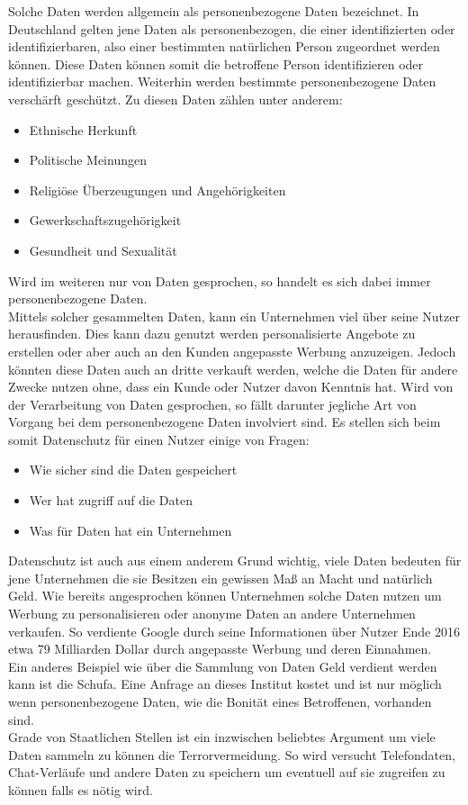 \documentclass[a4paper, 12pt]{article}
\begin{document}
\noindent 
Solche Daten werden allgemein als personenbezogene Daten bezeichnet. In Deutschland gelten jene Daten als personenbezogen, die einer identifizierten oder identifizierbaren, also einer bestimmten natürlichen Person zugeordnet werden können. Diese Daten können somit die betroffene Person identifizieren oder identifizierbar machen. Weiterhin werden bestimmte personenbezogene Daten verschärft geschützt. Zu diesen Daten zählen unter anderem:
\begin{itemize}
	\item Ethnische Herkunft
	\item Politische Meinungen
	\item Religiöse Überzeugungen und Angehörigkeiten
	\item Gewerkschaftszugehörigkeit
	\item Gesundheit und Sexualität
\end{itemize}
\noindent Wird im weiteren nur von Daten gesprochen, so handelt es sich dabei immer personenbezogene Daten. \\

\noindent Mittels solcher gesammelten Daten, kann ein Unternehmen viel über seine Nutzer herausfinden. Dies kann dazu genutzt werden personalisierte Angebote zu erstellen oder aber auch an den Kunden angepasste Werbung anzuzeigen. Jedoch könnten diese Daten auch an dritte verkauft werden, welche die Daten für andere Zwecke nutzen ohne, dass ein Kunde oder Nutzer davon Kenntnis hat. Wird von der Verarbeitung von Daten gesprochen, so fällt darunter jegliche Art von Vorgang bei dem personenbezogene Daten involviert sind.
Es stellen sich beim somit Datenschutz für einen Nutzer einige von Fragen:
\begin{itemize}
	\item Wie sicher sind die Daten gespeichert
	\item Wer hat zugriff auf die Daten
	\item Was für Daten hat ein Unternehmen
\end{itemize}
\noindent Datenschutz ist auch aus einem anderem Grund wichtig, viele Daten bedeuten für jene Unternehmen die sie Besitzen ein gewissen Maß an Macht und natürlich Geld. Wie bereits angesprochen können Unternehmen solche Daten nutzen um Werbung zu personalisieren oder anonyme Daten an andere Unternehmen verkaufen. So verdiente Google durch seine Informationen über Nutzer Ende 2016 etwa 79 Milliarden Dollar durch angepasste Werbung und deren Einnahmen.\\ Ein anderes Beispiel wie über die Sammlung von Daten Geld verdient werden kann ist die Schufa. Eine Anfrage an dieses Institut kostet und ist nur möglich wenn personenbezogene Daten, wie die Bonität eines Betroffenen, vorhanden sind.\\
Grade von Staatlichen Stellen ist ein inzwischen beliebtes Argument um viele Daten sammeln zu können die Terrorvermeidung. So wird versucht Telefondaten, Chat-Verläufe und andere Daten zu speichern um eventuell auf sie zugreifen zu können falls es nötig wird. 
\end{document}
